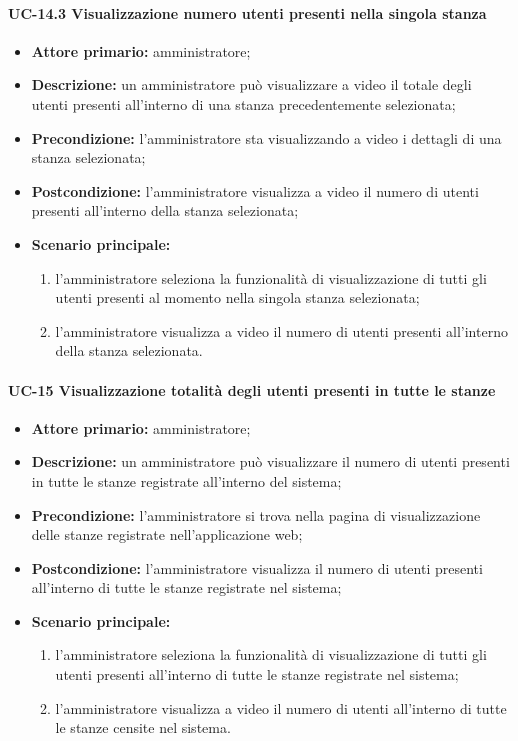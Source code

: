 \paragraph{UC-14.3 Visualizzazione numero utenti presenti nella singola stanza}
\begin{itemize}
    \item \textbf{Attore primario:} amministratore;
    \item \textbf{Descrizione:} un amministratore pu\`{o} visualizzare a video il totale degli utenti presenti all'interno di una stanza precedentemente selezionata;
    \item \textbf{Precondizione:} l'amministratore sta visualizzando a video i dettagli di una stanza selezionata;
    \item \textbf{Postcondizione:} l'amministratore visualizza a video il numero di utenti presenti all'interno della stanza selezionata;
    \item \textbf{Scenario principale:}
    \begin{enumerate}
        \item l'amministratore seleziona la funzionalità di visualizzazione di tutti gli utenti presenti al momento nella singola stanza selezionata;
        \item l'amministratore visualizza a video il numero di utenti presenti all'interno della stanza selezionata.
    \end{enumerate}
\end{itemize}


\paragraph{UC-15 Visualizzazione totalità degli utenti presenti in tutte le stanze}
\begin{itemize}
    \item \textbf{Attore primario:} amministratore;
    \item \textbf{Descrizione:} un amministratore pu\`{o} visualizzare il numero di utenti presenti in tutte le stanze registrate all'interno del sistema;
    \item \textbf{Precondizione:} l'amministratore si trova nella pagina di visualizzazione delle stanze registrate nell'applicazione web;
    \item \textbf{Postcondizione:} l'amministratore visualizza il numero di utenti presenti all'interno di tutte le stanze registrate nel sistema;
    \item \textbf{Scenario principale:}
    \begin{enumerate}
        \item l'amministratore seleziona la funzionalità di visualizzazione di tutti gli utenti presenti all'interno di tutte le stanze registrate nel sistema;
        \item l'amministratore visualizza a video il numero di utenti all'interno di tutte le stanze censite nel sistema.
    \end{enumerate}
\end{itemize}

